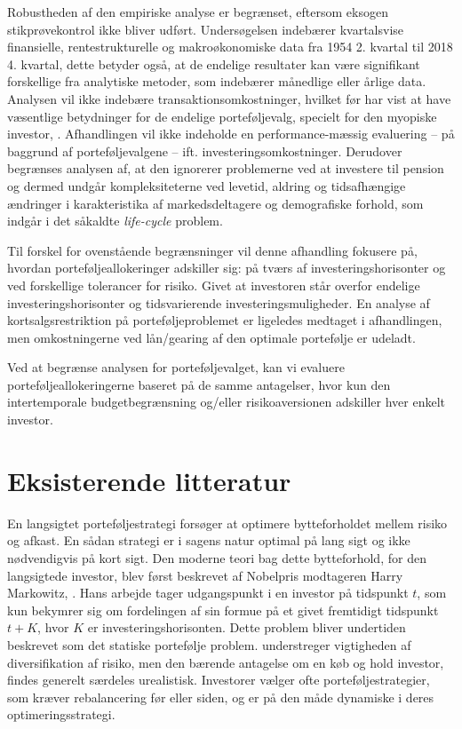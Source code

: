 \documentclass[
  a4paper,
  oneside]{memoir}
\begin{document}
Robustheden af den empiriske analyse er begrænset, eftersom eksogen stikprøvekontrol ikke bliver udført. Undersøgelsen indebærer kvartalsvise finansielle, rentestrukturelle og makroøkonomiske data fra 1954 2. kvartal til 2018 4. kvartal, dette betyder også, at de endelige resultater kan være signifikant forskellige fra analytiske metoder, som indebærer månedlige eller årlige data. Analysen vil ikke indebære transaktionsomkostninger, hvilket før har vist at have væsentlige betydninger for de endelige porteføljevalg, specielt for den myopiske investor, \citep{BalLyn1999}. Afhandlingen vil ikke indeholde en performance-mæssig evaluering -- på baggrund af porteføljevalgene -- ift. investeringsomkostninger. Derudover begrænses analysen af, at den ignorerer problemerne ved at investere til pension og dermed undgår kompleksiteterne ved levetid, aldring og tidsafhængige ændringer i karakteristika af markedsdeltagere og demografiske forhold, som indgår i det såkaldte \emph{life-cycle} problem.

Til forskel for ovenstående begrænsninger vil denne afhandling fokusere på, hvordan porteføljeallokeringer adskiller sig: på tværs af investeringshorisonter og ved forskellige tolerancer for risiko. Givet at investoren står overfor endelige investeringshorisonter og tidsvarierende investeringsmuligheder.
En analyse af kortsalgsrestriktion på porteføljeproblemet er ligeledes medtaget i afhandlingen, men omkostningerne ved lån/gearing af den optimale portefølje er udeladt.

Ved at begrænse analysen for porteføljevalget, kan vi evaluere porteføljeallokeringerne baseret på de samme antagelser, hvor kun den intertemporale budgetbegrænsning og/eller risikoaversionen adskiller hver enkelt investor.

\hypertarget{eksisterende-litteratur}{%
\section{Eksisterende litteratur}\label{eksisterende-litteratur}}

En langsigtet porteføljestrategi forsøger at optimere bytteforholdet mellem risiko og afkast. En sådan strategi er i sagens natur optimal på lang sigt og ikke nødvendigvis på kort sigt. Den moderne teori bag dette bytteforhold, for den langsigtede investor, blev først beskrevet af Nobelpris modtageren Harry Markowitz, \citep{Markowitz1952}. Hans arbejde tager udgangspunkt i en investor på tidspunkt \(t\), som kun bekymrer sig om fordelingen af sin formue på et givet fremtidigt tidspunkt \(t+K\), hvor \(K\) er investeringshorisonten. Dette problem bliver undertiden beskrevet som det statiske portefølje problem. \citep{Markowitz1952} understreger vigtigheden af diversifikation af risiko, men den bærende antagelse om en køb og hold investor, findes generelt særdeles urealistisk. Investorer vælger ofte porteføljestrategier, som kræver rebalancering før eller siden, og er på den måde dynamiske i deres optimeringsstrategi.
\end{document}
